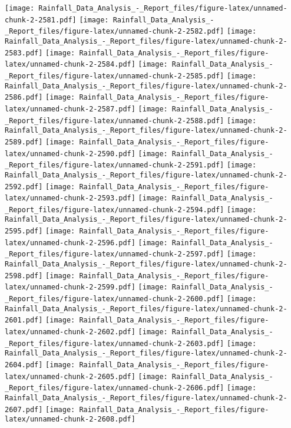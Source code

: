 \documentclass[
]{article}
\begin{document}
\texttt{[image: Rainfall\_Data\_Analysis\_-\_Report\_files/figure-latex/unnamed-chunk-2-2581.pdf]}
\texttt{[image: Rainfall\_Data\_Analysis\_-\_Report\_files/figure-latex/unnamed-chunk-2-2582.pdf]}
\texttt{[image: Rainfall\_Data\_Analysis\_-\_Report\_files/figure-latex/unnamed-chunk-2-2583.pdf]}
\texttt{[image: Rainfall\_Data\_Analysis\_-\_Report\_files/figure-latex/unnamed-chunk-2-2584.pdf]}
\texttt{[image: Rainfall\_Data\_Analysis\_-\_Report\_files/figure-latex/unnamed-chunk-2-2585.pdf]}
\texttt{[image: Rainfall\_Data\_Analysis\_-\_Report\_files/figure-latex/unnamed-chunk-2-2586.pdf]}
\texttt{[image: Rainfall\_Data\_Analysis\_-\_Report\_files/figure-latex/unnamed-chunk-2-2587.pdf]}
\texttt{[image: Rainfall\_Data\_Analysis\_-\_Report\_files/figure-latex/unnamed-chunk-2-2588.pdf]}
\texttt{[image: Rainfall\_Data\_Analysis\_-\_Report\_files/figure-latex/unnamed-chunk-2-2589.pdf]}
\texttt{[image: Rainfall\_Data\_Analysis\_-\_Report\_files/figure-latex/unnamed-chunk-2-2590.pdf]}
\texttt{[image: Rainfall\_Data\_Analysis\_-\_Report\_files/figure-latex/unnamed-chunk-2-2591.pdf]}
\texttt{[image: Rainfall\_Data\_Analysis\_-\_Report\_files/figure-latex/unnamed-chunk-2-2592.pdf]}
\texttt{[image: Rainfall\_Data\_Analysis\_-\_Report\_files/figure-latex/unnamed-chunk-2-2593.pdf]}
\texttt{[image: Rainfall\_Data\_Analysis\_-\_Report\_files/figure-latex/unnamed-chunk-2-2594.pdf]}
\texttt{[image: Rainfall\_Data\_Analysis\_-\_Report\_files/figure-latex/unnamed-chunk-2-2595.pdf]}
\texttt{[image: Rainfall\_Data\_Analysis\_-\_Report\_files/figure-latex/unnamed-chunk-2-2596.pdf]}
\texttt{[image: Rainfall\_Data\_Analysis\_-\_Report\_files/figure-latex/unnamed-chunk-2-2597.pdf]}
\texttt{[image: Rainfall\_Data\_Analysis\_-\_Report\_files/figure-latex/unnamed-chunk-2-2598.pdf]}
\texttt{[image: Rainfall\_Data\_Analysis\_-\_Report\_files/figure-latex/unnamed-chunk-2-2599.pdf]}
\texttt{[image: Rainfall\_Data\_Analysis\_-\_Report\_files/figure-latex/unnamed-chunk-2-2600.pdf]}
\texttt{[image: Rainfall\_Data\_Analysis\_-\_Report\_files/figure-latex/unnamed-chunk-2-2601.pdf]}
\texttt{[image: Rainfall\_Data\_Analysis\_-\_Report\_files/figure-latex/unnamed-chunk-2-2602.pdf]}
\texttt{[image: Rainfall\_Data\_Analysis\_-\_Report\_files/figure-latex/unnamed-chunk-2-2603.pdf]}
\texttt{[image: Rainfall\_Data\_Analysis\_-\_Report\_files/figure-latex/unnamed-chunk-2-2604.pdf]}
\texttt{[image: Rainfall\_Data\_Analysis\_-\_Report\_files/figure-latex/unnamed-chunk-2-2605.pdf]}
\texttt{[image: Rainfall\_Data\_Analysis\_-\_Report\_files/figure-latex/unnamed-chunk-2-2606.pdf]}
\texttt{[image: Rainfall\_Data\_Analysis\_-\_Report\_files/figure-latex/unnamed-chunk-2-2607.pdf]}
\texttt{[image: Rainfall\_Data\_Analysis\_-\_Report\_files/figure-latex/unnamed-chunk-2-2608.pdf]}
\end{document}
